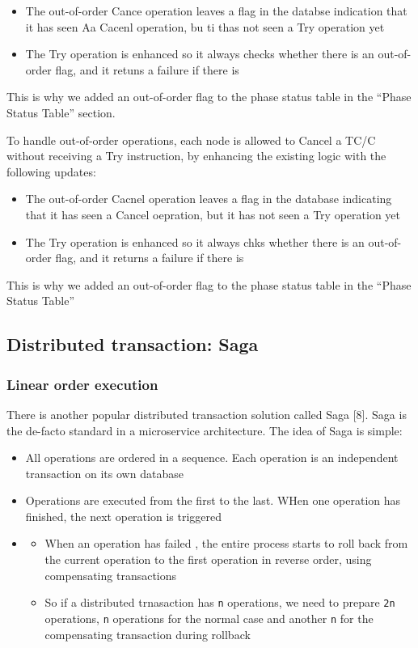 \documentclass{report}
\theoremstyle{definition}
\let\oldsubsection\subsection
\let\oldsubsubsection\subsubsection
\renewcommand{\subsection}{\oldsubsection*}
\renewcommand{\subsubsection}{\oldsubsubsection*}
\begin{document}
\begin{itemize}
\item
The out-of-order Cance operation leaves a flag in the databse indication that it has seen Aa Cacenl operation, bu ti thas not seen a Try operation yet
\item
The Try operation is enhanced so it always checks whether there is an out-of-order flag, and it retuns a failure if there is
\end{itemize}

This is why we added an out-of-order flag to the phase status table in the ``Phase Status Table'' section.

To handle out-of-order operations, each node is allowed to Cancel a TC/C without receiving a Try instruction, by enhancing the existing logic with the following updates:

\begin{itemize}
\item
The out-of-order Cacnel operation leaves a flag in the database indicating that it has seen a Cancel oepration, but it has not seen a Try operation yet
\item
The Try operation is enhanced so it always chks whether there is an out-of-order flag, and it returns a failure if there is
\end{itemize}

This is why we added an out-of-order flag to the phase status table in the ``Phase Status Table''

\subsection{Distributed transaction: Saga}

\subsubsection{Linear order execution}

There is another popular distributed transaction solution called Saga [8]. Saga is the de-facto standard in a microservice architecture. The idea of Saga is simple:

\begin{itemize}
\item
All operations are ordered in a sequence. Each operation is an independent transaction on its own database
\item
Operations are executed from the first to the last. WHen one operation has finished, the next operation is triggered
\item

\begin{itemize}
\item
When an operation has failed , the entire process starts to roll back from the current operation to the first operation in reverse order, using compensating transactions
\item
So if a distributed trnasaction has \lstinline|n| operations, we need to prepare \lstinline|2n| operations, \lstinline|n| operations for the normal case and another \lstinline|n| for the compensating transaction during rollback
\end{itemize}
\end{itemize}
\end{document}
